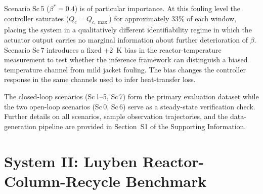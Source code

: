 \documentclass[aps,pre,twocolumn,superscriptaddress,floatfix]{revtex4-2}
\begin{document}
Scenario Sc\,5 ($\beta^* = 0.4$) is of particular importance. At this fouling level the 
controller saturates ($Q_c = Q_{c,\max}$) for approximately 33\% of each window, placing the 
system in a qualitatively different identifiability regime in which the actuator output carries 
no marginal information about further deterioration of $\beta$.  Scenario Sc\,7 introduces 
a fixed $+2$~K bias in the reactor-temperature measurement to test whether the inference 
framework can distinguish a biased temperature channel from mild jacket fouling. The bias changes the controller response in the same channels used to infer heat-transfer loss.

The closed-loop scenarios (Sc\,1--5, Sc\,7) form the primary evaluation dataset while the 
two open-loop scenarios (Sc\,0, Sc\,6) serve as a steady-state verification check. 
Further details on all scenarios, sample observation trajectories, and the data-generation 
pipeline are provided in Section~S1 of the Supporting Information.

\section{System II: Luyben Reactor-Column-Recycle Benchmark}
\label{sec:system2}
\end{document}
